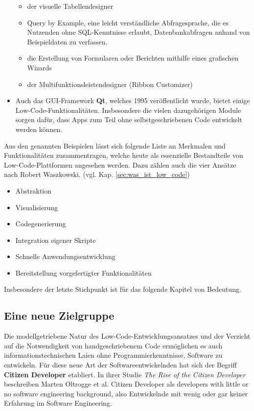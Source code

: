 \documentclass[acmtog, language=ngerman]{acmart}
\begin{document}
\begin{itemize}
    \begin{itemize}
        \item der visuelle Tabellendesigner
        \item Query by Example, eine leicht verständliche Abfragesprache, die es Nutzenden ohne SQL-Kenntnisse erlaubt, Datenbankabfragen anhand von Beispieldaten zu verfassen.
        \item die Erstellung von Formularen oder Berichten mithilfe eines grafischen Wizards
        \item der Multifunktionsleistendesigner (Ribbon Customizer)
    \end{itemize}
    \item Auch das GUI-Framework \textbf{Qt}, welches 1995 veröffentlicht wurde, bietet einige Low-Code-Funktionalitäten. Insbesondere die vielen dazugehörigen Module sorgen dafür, dass Apps zum Teil ohne selbstgeschriebenen Code entwickelt werden können. \cite{piccolino}
\end{itemize}

Aus den genannten Beispielen lässt sich folgende Liste an Merkmalen und Funktionalitäten zusammentragen, welche heute als essenzielle Bestandteile von Low-Code-Plattformen angesehen werden. Dazu zählen auch die vier Ansätze nach Robert Waszkowski. (vgl. Kap. \ref{sec:was_ist_low_code})

\begin{itemize}
    \item Abstraktion
    \item Visualisierung
    \item Codegenerierung
    \item Integration eigener Skripte
    \item Schnelle Anwendungsentwicklung
    \item Bereitstellung vorgefertigter Funktionalitäten
\end{itemize}

Insbesondere der letzte Stichpunkt ist für das folgende Kapitel von Bedeutung.

\subsection{Eine neue Zielgruppe} \label{sec:citizen_developer}
Die modellgetriebene Natur des Low-Code-Entwicklungsansatzes und der Verzicht auf die Notwendigkeit von handgeschriebenem Code ermöglichen es auch informationstechnischen Laien ohne Programmierkenntnisse, Software zu entwickeln. Für diese neue Art der Softwareentwickelnden hat sich der Begriff \textbf{Citizen Developer} etabliert. In ihrer Studie \textit{The Rise of the Citizen Developer} beschreiben Marten Oltrogge et al. Citizen Developer als \glqq developers with little or no software engineering background\grqq, also Entwickelnde mit wenig oder gar keiner Erfahrung im Software Engineering. \cite{oltrogge_2018}
\end{document}
